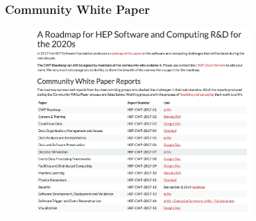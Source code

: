 \begin{frame}
\frametitle{Community White Paper}

\begin{figure}[htbp]
\begin{center}
\includegraphics[width=0.74\textwidth]{images/CWP-documents.png}
\end{center}
\end{figure}


\end{frame}


